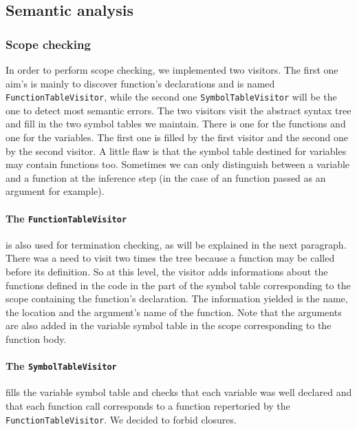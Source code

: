 \documentclass[a4paper,11pt]{article}
\begin{document}
\subsection{Semantic analysis}
\subsubsection{Scope checking}
In order to perform scope checking, we implemented two visitors. The first one aim's is mainly to discover function's declarations and is named \texttt{FunctionTableVisitor}, while the second one \texttt{SymbolTableVisitor} will be the one to detect most semantic errors. The two visitors visit the abstract syntax tree and fill in the two symbol tables we maintain. There is one for the functions and one for the variables. The first one is filled by the first visitor and the second one by the second visitor. A little flaw is that the symbol table destined for variables may contain functions too. Sometimes we can only distinguish between a variable and a function at the inference step (in the case of an function passed as an argument for example).
\paragraph{The \texttt{FunctionTableVisitor}} is also used for termination checking, as will be explained in the next paragraph. There was a need to visit two times the tree because a function may be called before its definition. So at this level, the visitor adds informations about the functions defined in the code in the part of the symbol table corresponding to the scope containing the function's declaration. The information yielded is the name, the location and the argument's name of the function. Note that the arguments are also added in the variable symbol table in the scope corresponding to the function body.

\paragraph{The \texttt{SymbolTableVisitor}} fills the variable symbol table and checks that each variable was well declared and that each function call corresponds to a function repertoried by the \texttt{FunctionTableVisitor}. We decided to forbid closures.
\end{document}
